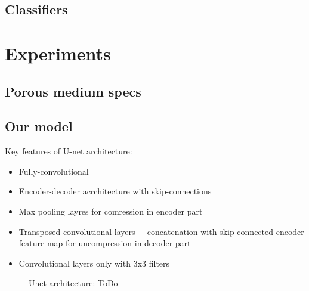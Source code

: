 \documentclass[review]{elsarticle}
\begin{document}
\subsection{Classifiers}

\section{Experiments}

\subsection{Porous medium specs}

\subsection{Our model}

Key features of U-net architecture:
\begin{itemize}
	\item Fully-convolutional 
	\item Encoder-decoder acrchitecture with skip-connections
	\item Max pooling layres for comression in encoder part
	\item Transposed convolutional layers + concatenation with skip-connected encoder feature map for uncompression in decoder part
	\item Convolutional layers only with 3x3 filters
\end{itemize}

\begin{figure}[h]
	\caption{Unet architecture: ToDo}
	\label{Unet:architecture}
\end{figure}
\end{document}
